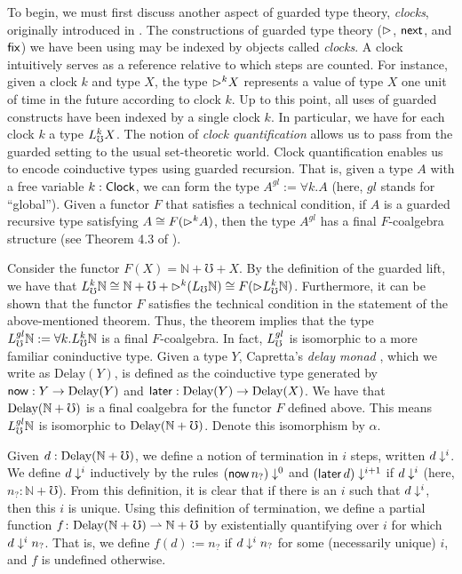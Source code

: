 To begin, we must first discuss another aspect of guarded type theory,
\emph{clocks}, originally introduced in \cite{atkey-mcbride2013}. The
constructions of guarded type theory (${\vartriangleright}$, $\mathsf{next}$, and $\mathsf{fix}$) we have been
using may be indexed by objects called \emph{clocks}. A clock intuitively serves
as a reference relative to which steps are counted. For instance, given a clock
$k$ and type $X$, the type ${\vartriangleright}^k X$ represents a value of type $X$ one unit
of time in the future according to clock $k$.
%
Up to this point, all uses of guarded constructs have been indexed by a single
clock $k$. In particular, we have for each clock $k$ a type $L_\mho^k X$. The
notion of \emph{clock quantification} allows us to pass from the guarded setting
to the usual set-theoretic world. Clock quantification enables us to encode
coinductive types using guarded recursion. That is, given a type $A$ with a free
variable $k : \mathsf{Clock}$, we can form the type $A^{gl} := \forall k. A$ (here, $gl$ stands for ``global''). Given a
functor $F$ that satisfies a technical condition, if $A$ is a guarded recursive
type satisfying $A \cong F({\vartriangleright}^k A)$, then the type $A^{gl}$ has a final
$F$-coalgebra structure (see Theorem 4.3 of
\cite{kristensen-mogelberg-vezzosi2022}). 

Consider the functor $F(X) = \mathbb{N} + {\mho} + X$. By the definition of the
guarded lift, we have that
% 
$L_\mho^k \mathbb{N} 
  \cong \mathbb{N} + {\mho} + {\vartriangleright}^k (L_\mho \mathbb{N}) 
  \cong F({\vartriangleright} L_\mho^k \mathbb{N})$.
%
Furthermore, it can be shown that the functor $F$ satisfies the technical
condition in the statement of the above-mentioned theorem. Thus, the theorem
implies that the type $L_\mho^{gl} \mathbb{N} := \forall k. L_\mho^k \mathbb{N}$ is a
final $F$-coalgebra. In fact, $L_\mho^{gl}$ is isomorphic to a more familiar coninductive type.
%
Given a type $Y$, Capretta's \emph{delay monad} \cite{lmcs:2265},
which we write as $\text{Delay}(Y)$, is defined as the coinductive type
generated by $\mathsf{now} : Y \to \text{Delay}(Y)$ and $\mathsf{later} : \text{Delay}(Y) \to \text{Delay}(X)$.
We have that $\text{Delay} (\mathbb{N} + {\mho})$ is a final coalgebra for the functor
$F$ defined above. This means $L_\mho^{gl} \mathbb{N}$ is isomorphic to
$\text{Delay}(\mathbb{N} + {\mho})$. Denote this isomorphism by $\alpha$.

Given $d : \text{Delay}(\mathbb{N} + {\mho})$, we define a notion of termination in
$i$ steps, written $d \downarrow^i$. We define $d \downarrow^i$ inductively by the rules
$(\mathsf{now}\, n_?) \downarrow^0$ and $(\mathsf{later}\, d) \downarrow^{i+1}$ if $d \downarrow^i$ (here, $n_? :
\mathbb{N} + {\mho}$). From this definition, it is clear that if there is an $i$
such that $d \downarrow^i$, then this $i$ is unique. 
Using this definition of termination, we define a partial function 
%
$f \colon \text{Delay} (\mathbb{N} + {\mho}) \rightharpoonup \mathbb{N} + {\mho}$
%
by existentially quantifying over $i$ for which $d \downarrow^i n_?$. That is, we
define $f(d) := n_?$ if $d \downarrow^i n_?$ for some (necessarily unique) $i$, and $f$
is undefined otherwise.

